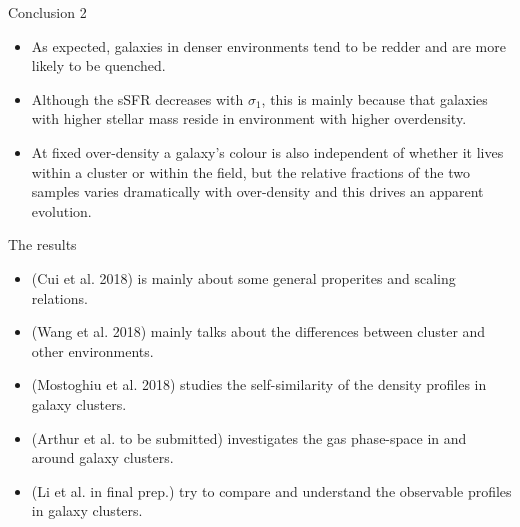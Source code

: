 \documentclass[aspectratio=43]{beamer}
\begin{document}
\begin{frame}{Conclusion 2}
  \begin{itemize}
    \item As expected, galaxies in denser environments tend to be redder and are more likely to be quenched.
    \item Although the sSFR decreases with $\sigma_1$, this is mainly because that galaxies with higher stellar mass reside in environment with higher overdensity. 
    \item At fixed over-density a galaxy's colour is also independent of whether it lives within a cluster or within the field, but the relative fractions of the two samples varies dramatically with over-density and this drives an apparent evolution.
  \end{itemize}
    \begin{center}
    \hyperlink{lastpage}{}    
  \end{center}
\end{frame}

\begin{frame}
  \begin{center}
    {\Huge The results} \\
    \bigskip
  \end{center}
  
  \begin{itemize}
      \item     \hyperlink{intropaper}{} (Cui et al. 2018) is mainly about some general properites and scaling relations.
      \item \hyperlink{Wang}{} (Wang et al. 2018)  mainly talks about the differences between cluster and other environments.
      \item \hyperlink{Mostoghiu}{} (Mostoghiu et al. 2018) studies the self-similarity of the density profiles in galaxy clusters.
      \item \hyperlink{Arthur}{} (Arthur et al. to be submitted) investigates the gas phase-space in and around galaxy clusters.
      \item \hyperlink{Li}{} (Li et al. in final prep.) try to compare and understand the observable profiles in galaxy clusters.
  \end{itemize}
\end{frame}
\end{document}
